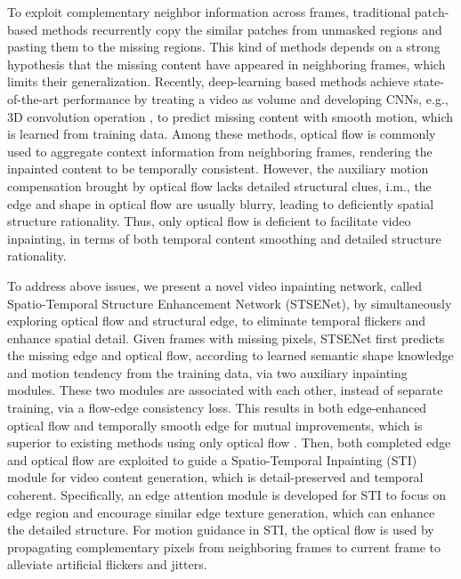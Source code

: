 \documentclass[letterpaper]{article} %
\begin{document}
To exploit complementary neighbor information across frames, traditional patch-based methods \cite{patwardhan2007video,wexler2004space,newson2014video} recurrently copy the similar patches from unmasked regions and pasting them to the missing regions. 
This kind of methods depends on a strong hypothesis that the missing content have appeared in neighboring frames, which limits their generalization.
Recently, deep-learning based methods achieve state-of-the-art performance by treating a video as volume and developing CNNs, e.g., 3D convolution operation \cite{wang2019video}, to predict missing content with smooth motion, which is learned from training data.
Among these methods, optical flow is commonly used \cite{Xu_2019_CVPR,Kim_2019_CVPR,Kim_2019_CVPR1} to aggregate context information from neighboring frames, rendering the inpainted content to be temporally consistent.
However, the auxiliary motion compensation brought by optical flow lacks detailed structural clues, i.m., the edge and shape in optical flow are usually blurry, leading to deficiently spatial structure rationality.
Thus, only optical flow is deficient to facilitate video inpainting, in terms of both temporal content smoothing and detailed structure rationality.

To address above issues, we present a novel video inpainting network, called Spatio-Temporal Structure Enhancement Network (STSENet), by simultaneously exploring optical flow and structural edge, to eliminate temporal flickers and enhance spatial detail. 
Given frames with missing pixels, STSENet first predicts the missing edge and optical flow, according to learned semantic shape knowledge and motion tendency from the training data, via two auxiliary inpainting modules.
These two modules are associated with each other, instead of separate training, via a flow-edge consistency loss.
This results in both edge-enhanced optical flow and temporally smooth edge for mutual improvements, which is superior to existing methods using only optical flow \cite{Xu_2019_CVPR,Kim_2019_CVPR1}.
Then, both completed edge and optical flow are exploited to guide a Spatio-Temporal Inpainting (STI) module for video content generation, which is detail-preserved and temporal coherent.
Specifically, an edge attention module is developed for STI to focus on edge region and encourage similar edge texture generation, which can enhance the detailed structure.
For motion guidance in STI, the optical flow is used by propagating complementary pixels from neighboring frames to current frame to alleviate artificial flickers and jitters.
\end{document}
